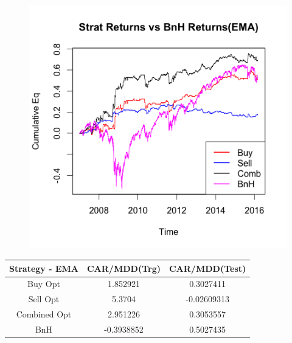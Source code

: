 \documentclass[12pt]{article}
\theoremstyle{definition}
\begin{document}
\begin{figure}[H]
\centering
\includegraphics[scale=0.7]{combeq2}
  \label{fig:c7}
\end{figure}

\begin{table}[H]
\centering
\begin{tabular}{|c|c|c|}
\hline
Strategy - EMA & CAR/MDD(Trg) & CAR/MDD(Test)\\ 
\hline
Buy Opt&1.852921& 0.3027411\\           
Sell Opt& 5.3704& -0.02609313\\
Combined Opt & 2.951226 &    0.3053557\\
BnH &  -0.3938852 & 0.5027435\\
\hline
\end{tabular}
\label{fig:c8}
\end{table}
\end{document}
